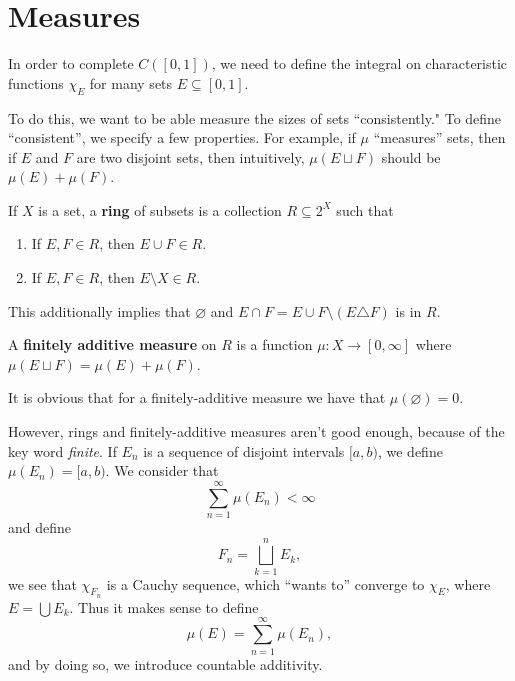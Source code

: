 \chapter{Measures}

In order to complete $C([0, 1])$, we need to define the integral on characteristic functions $\chi_E$ for many sets $E \subseteq [0, 1]$.

To do this, we want to be able measure the sizes of sets ``consistently." To define ``consistent'', we specify a few properties. For example, if $\mu$ ``measures'' sets, then if $E$ and $F$ are two disjoint sets, then intuitively, $\mu(E \sqcup F)$ should be $\mu(E) + \mu(F)$.

\begin{definition}
    If $X$ is a set, a \textbf{ring} of subsets is a collection $R \subseteq 2^X$ such that \begin{enumerate}
        \item If $E, F \in R$, then $E \cup F \in R$.
        \item If $E, F \in R$, then $E \setminus X \in R$.
    \end{enumerate}
    This additionally implies that $\varnothing$ and $E \cap F = E \cup F \setminus (E \triangle F)$ is in $R$.

    A \textbf{finitely additive measure} on $R$ is a function $\mu \colon X \to [0, \infty]$ where $\mu(E \sqcup F) = \mu(E) + \mu(F)$.
\end{definition}

It is obvious that for a finitely-additive measure we have that $\mu(\varnothing) = 0$.

However, rings and finitely-additive measures aren't good enough, because of the key word \emph{finite}. If $E_n$ is a sequence of disjoint intervals $[a, b)$, we define $\mu(E_n) = [a, b)$. We consider that \[\sum_{n = 1}^\infty \mu(E_n) < \infty \] and define \[F_n = \bigsqcup_{k = 1}^n E_k,\] we see that $\chi_{F_n}$ is a Cauchy sequence, which ``wants to'' converge to $\chi_E$, where $E = \bigcup E_k$. Thus it makes sense to define \[\mu(E) = \sum_{n = 1}^\infty \mu(E_n),\] and by doing so, we introduce countable additivity.